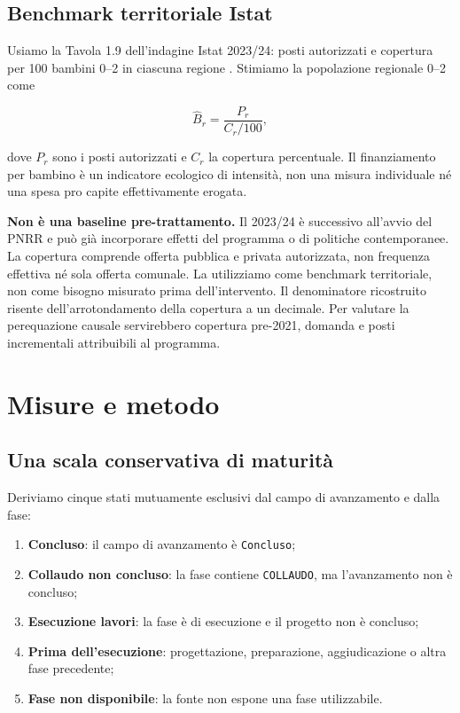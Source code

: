 \documentclass[10pt,a4paper]{article}
\begin{document}
\subsection{Benchmark territoriale Istat}

Usiamo la Tavola 1.9 dell'indagine Istat 2023/24: posti autorizzati e copertura per 100 bambini 0--2 in ciascuna regione \citep{istat2026}. Stimiamo la popolazione regionale 0--2 come

\begin{equation}
  \widehat{B}_r = \frac{P_r}{C_r/100},
\end{equation}

dove $P_r$ sono i posti autorizzati e $C_r$ la copertura percentuale. Il finanziamento per bambino è un indicatore ecologico di intensità, non una misura individuale né una spesa pro capite effettivamente erogata.

\textbf{Non è una baseline pre-trattamento.} Il 2023/24 è successivo all'avvio del PNRR e può già incorporare effetti del programma o di politiche contemporanee. La copertura comprende offerta pubblica e privata autorizzata, non frequenza effettiva né sola offerta comunale. La utilizziamo come benchmark territoriale, non come bisogno misurato prima dell'intervento. Il denominatore ricostruito risente dell'arrotondamento della copertura a un decimale. Per valutare la perequazione causale servirebbero copertura pre-2021, domanda e posti incrementali attribuibili al programma.

\section{Misure e metodo}

\subsection{Una scala conservativa di maturità}

Deriviamo cinque stati mutuamente esclusivi dal campo di avanzamento e dalla fase:

\begin{enumerate}
  \item \textbf{Concluso}: il campo di avanzamento è \texttt{Concluso};
  \item \textbf{Collaudo non concluso}: la fase contiene \texttt{COLLAUDO}, ma l'avanzamento non è concluso;
  \item \textbf{Esecuzione lavori}: la fase è di esecuzione e il progetto non è concluso;
  \item \textbf{Prima dell'esecuzione}: progettazione, preparazione, aggiudicazione o altra fase precedente;
  \item \textbf{Fase non disponibile}: la fonte non espone una fase utilizzabile.
\end{enumerate}
\end{document}
